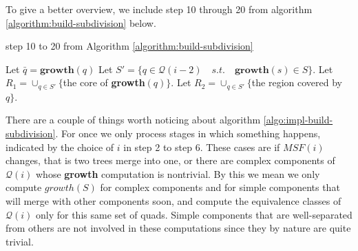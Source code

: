 To give a better overview, we include step 10 through 20 from algorithm 
\ref{algorithm:build-subdivision} below.

\begin{algorithm}[H]
	\caption{step 10 to 20 from Algorithm \ref{algorithm:build-subdivision}}  
	\begin{algorithmic}[1]
            \State Let $\bar{q} = \mathbf{growth}(q)$
                \State {}
            \EndIf
        \EndFor
            \State Let $S'=\{q\in\mathcal{Q}(i-2) \quad s.t. \quad 
            \mathbf{growth}(s)\in S\}$.
                \State Let $R_1 = \cup_{q\in S'} \{$the core of 
                \textbf{growth}$(q)\}.$
                \State Let $R_2 = \cup_{q\in S'} \{$the region covered by 
                $q\}.$
                \State {}
                \State {}
            \EndIf
        \EndFor
	\end{algorithmic} 
\end{algorithm}


There are a couple of things worth noticing about algorithm \ref{algo:impl-build-subdivision}. For once 
we only process stages in which something happens, indicated by the choice of $i$ in step 2 to step 6. 
These cases are if $MSF(i)$ changes, that is two trees merge into one, or there are complex components 
of $\mathcal{Q}(i)$ whose \textbf{growth} computation is nontrivial. By this we mean we only compute 
$growth(S)$ for complex components and for simple components that will merge with other components soon, 
and compute the equivalence classes of $\mathcal{Q}(i)$ only for this same set of quads. Simple 
components that are well-separated from others are not involved in these computations since they by 
nature are quite trivial. 


